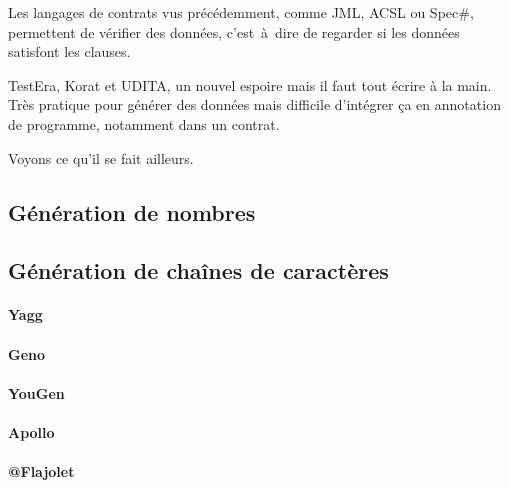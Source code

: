 


Les langages de contrats vus précédemment, comme JML, ACSL ou Spec\#, permettent
de vérifier des données, c'est~à~dire de regarder si les données satisfont les
clauses.

TestEra, Korat et UDITA, un nouvel espoire mais il faut tout écrire à la main.
Très pratique pour générer des données mais difficile d'intégrer ça en
annotation de programme, notamment dans un contrat.

Voyons ce qu'il se fait ailleurs.

\subsection{Génération de nombres}

\subsection{Génération de chaînes de caractères}

\paragraph{Yagg}

\paragraph{Geno}

\paragraph{YouGen}

\paragraph{Apollo}

\paragraph{@Flajolet}

